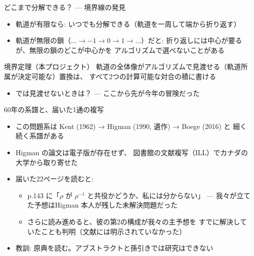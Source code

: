 \documentclass[aspectratio=169,11pt]{beamer}
\begin{document}
\begin{frame}{どこまで分解できる？ --- 境界線の発見}
  \begin{itemize}
    \item 軌道が有限なら: いつでも分解できる（軌道を一周して端から折り返す）
    \item 軌道が無限の鎖（\(\ldots \to -1 \to 0 \to 1 \to \ldots\)）だと:
      折り返しには\alert{中心}が要るが、無限の鎖のどこが中心かを
      \alert{アルゴリズムで選べない}ことがある
  \end{itemize}
  \begin{block}{境界定理（本プロジェクト）}
    軌道の全体像がアルゴリズムで見渡せる（軌道所属が決定可能な）置換は、
    すべて2つの計算可能な対合の積に書ける
  \end{block}
  \begin{itemize}
    \item では見渡せないときは？ --- ここから先が今年の冒険だった
  \end{itemize}
\end{frame}

\begin{frame}{60年の系譜と、届いた1通の複写}
  \begin{itemize}
    \item この問題系は Kent (1962) → \alert{Higman (1990, 遺作)} → Boege (2016) と
      細く続く系譜がある
    \item Higman の論文は電子版が存在せず、
      \alert{図書館の文献複写（ILL）でカナダの大学から取り寄せた}
    \item 届いた22ページを読むと:
    \begin{itemize}
      \item p.143 に「\(\rho\) が \(\rho^{-1}\) と共役かどうか、私には分からない」
        --- 我々が立てた予想は\alert{Higman 本人が残した未解決問題}だった
      \item さらに読み進めると、彼の第2の構成が我々の主予想を
        \alert{すでに解決していた}ことも判明（文献には明示されていなかった）
    \end{itemize}
    \item 教訓: 原典を読む。アブストラクトと孫引きでは研究はできない
  \end{itemize}
\end{frame}
\end{document}
